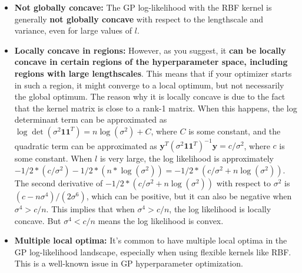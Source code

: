 \begin{itemize}
    \item \textbf{Not globally concave:} The GP log-likelihood with the RBF kernel is generally \textbf{not globally concave} with respect to the lengthscale and variance, even for large values of $l$.
    \item \textbf{Locally concave in regions:} However, as you suggest, it \textbf{can be locally concave in certain regions of the hyperparameter space, including regions with large lengthscales}. This means that if your optimizer starts in such a region, it might converge to a local optimum, but not necessarily the global optimum. The reason why it is locally concave is due to the fact that the kernel matrix is close to a rank-1 matrix. When this happens, the log determinant term can be approximated as $\log \det(\sigma^2 \mathbf{11}^T) = n\log(\sigma^2) + C$, where $C$ is some constant, and the quadratic term can be approximated as $\mathbf{y}^T(\sigma^2 \mathbf{11}^T)^{-1}\mathbf{y} = c/\sigma^2$, where $c$ is some constant. When $l$ is very large, the log likelihood is approximately $-1/2*(c/\sigma^2) - 1/2*(n*\log(\sigma^2)) = -1/2*(c/\sigma^2 + n\log(\sigma^2))$. The second derivative of $-1/2*(c/\sigma^2 + n\log(\sigma^2))$ with respect to $\sigma^2$ is $(c - n\sigma^4)/(2\sigma^6)$, which can be positive, but it can also be negative when $\sigma^4 > c/n$. This implies that when $\sigma^4 > c/n$, the log likelihood is locally concave. But $\sigma^4 < c/n$ means the log likelihood is convex.
    \item \textbf{Multiple local optima:} It's common to have multiple local optima in the GP log-likelihood landscape, especially when using flexible kernels like RBF. This is a well-known issue in GP hyperparameter optimization.
\end{itemize}

